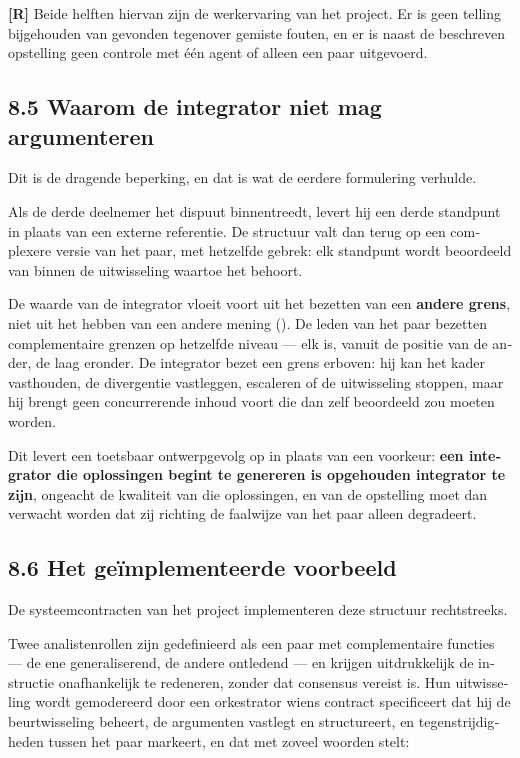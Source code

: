 \begin{dutch}
\textbf{[R]} Beide helften hiervan zijn de werkervaring van het project. Er is geen telling bijgehouden van gevonden tegenover gemiste fouten, en er is naast de beschreven opstelling geen controle met één agent of alleen een paar uitgevoerd.


\subsection*{8.5 Waarom de integrator niet mag argumenteren}
\label{sec:nl:8.5}

Dit is de dragende beperking, en dat is wat de eerdere formulering verhulde.

Als de derde deelnemer het dispuut binnentreedt, levert hij een derde standpunt in plaats van een externe referentie. De structuur valt dan terug op een complexere versie van het paar, met hetzelfde gebrek: elk standpunt wordt beoordeeld van binnen de uitwisseling waartoe het behoort.

De waarde van de integrator vloeit voort uit het bezetten van een \textbf{andere grens}, niet uit het hebben van een andere mening (). De leden van het paar bezetten complementaire grenzen op hetzelfde niveau — elk is, vanuit de positie van de ander, de laag eronder. De integrator bezet een grens erboven: hij kan het kader vasthouden, de divergentie vastleggen, escaleren of de uitwisseling stoppen, maar hij brengt geen concurrerende inhoud voort die dan zelf beoordeeld zou moeten worden.

Dit levert een toetsbaar ontwerpgevolg op in plaats van een voorkeur: \textbf{een integrator die oplossingen begint te genereren is opgehouden integrator te zijn}, ongeacht de kwaliteit van die oplossingen, en van de opstelling moet dan verwacht worden dat zij richting de faalwijze van het paar alleen degradeert.


\subsection*{8.6 Het geïmplementeerde voorbeeld}
\label{sec:nl:8.6}

De systeemcontracten van het project implementeren deze structuur rechtstreeks.

Twee analistenrollen zijn gedefinieerd als een paar met complementaire functies — de ene generaliserend, de andere ontledend — en krijgen uitdrukkelijk de instructie onafhankelijk te redeneren, zonder dat consensus vereist is. Hun uitwisseling wordt gemodereerd door een orkestrator wiens contract specificeert dat hij de beurtwisseling beheert, de argumenten vastlegt en structureert, en tegenstrijdigheden tussen het paar markeert, en dat met zoveel woorden stelt:


\end{dutch}
